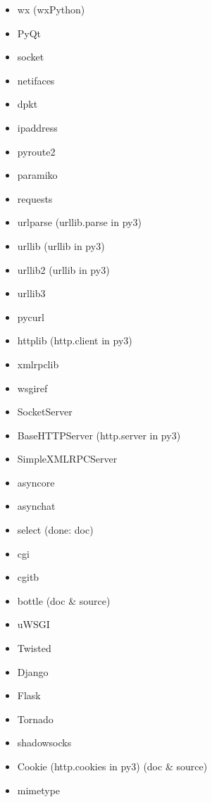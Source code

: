 \documentclass{article}
\begin{document}
\begin{enumerate}
\begin{itemize}
            \item wx (wxPython)
            \item PyQt

            \item socket
            \item netifaces
            \item dpkt
            \item ipaddress
            \item pyroute2
            \item paramiko
            \item requests
            \item urlparse (urllib.parse in py3)
            \item urllib (urllib in py3)
            \item urllib2 (urllib in py3)
            \item urllib3
            \item pycurl
            \item httplib (http.client in py3)
            \item xmlrpclib
            \item wsgiref
            \item SocketServer
            \item BaseHTTPServer (http.server in py3)
            \item SimpleXMLRPCServer
            \item asyncore
            \item asynchat
            \item select (done: doc)
            \item cgi
            \item cgitb
            \item bottle (doc & source)
            \item uWSGI
            \item Twisted
            \item Django
            \item Flask
            \item Tornado
            \item shadowsocks
            \item Cookie (http.cookies in py3) (doc & source)

            \item mimetype


\end{itemize}
\end{enumerate}
\end{document}
